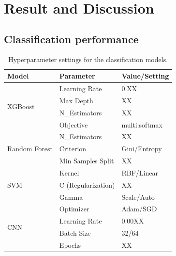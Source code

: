 \documentclass[preprint,12pt]{elsarticle}
\begin{document}
\section{Result and Discussion}
\subsection{Classification performance}
\begin{table}[h]
\centering
\caption{Hyperparameter settings for the classification models.}
\label{tab:hyperparameters}
\begin{tabular}{lll}
\hline
\textbf{Model} & \textbf{Parameter} & \textbf{Value/Setting} \\ \hline
\multirow{4}{*}{XGBoost} & Learning Rate & 0.XX \\
 & Max Depth & XX \\
 & N\_Estimators & XX \\
 & Objective & multi:softmax \\ \hline
\multirow{3}{*}{Random Forest} & N\_Estimators & XX \\
 & Criterion & Gini/Entropy \\
 & Min Samples Split & XX \\ \hline
\multirow{3}{*}{SVM} & Kernel & RBF/Linear \\
 & C (Regularization) & XX \\
 & Gamma & Scale/Auto \\ \hline
\multirow{4}{*}{CNN} & Optimizer & Adam/SGD \\
 & Learning Rate & 0.00XX \\
 & Batch Size & 32/64 \\
 & Epochs & XX \\ \hline
\end{tabular}
\end{table}

\begin{table}[!htbp]
\centering
\caption{The classification performance of models in random splitting scenarios (in percentage, higher is better)}
\label{tab:random_split_performance}
\end{table}
\end{document}
